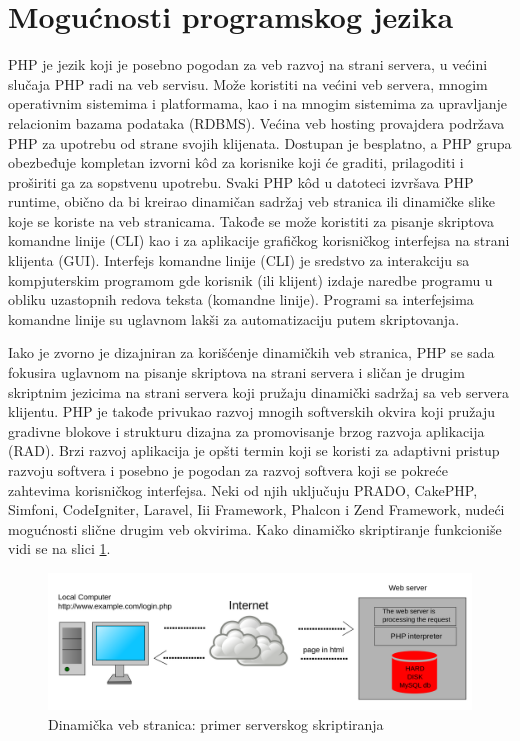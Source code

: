 \documentclass[a4paper]{article}
\begin{document}
{\section{Mogućnosti programskog jezika}
PHP je jezik koji je posebno pogodan za veb razvoj na strani servera, u većini slučaja PHP radi na veb servisu. Može koristiti na većini veb servera, mnogim operativnim sistemima i platformama, kao i na mnogim sistemima za upravljanje relacionim bazama podataka (RDBMS). Većina veb hosting provajdera podržava PHP za upotrebu od strane svojih klijenata. Dostupan je besplatno, a PHP grupa obezbeđuje kompletan izvorni k\^{o}d za korisnike koji će graditi, prilagoditi i proširiti ga za sopstvenu upotrebu. Svaki PHP k\^{o}d u datoteci izvršava PHP runtime\cite{php}, obično da bi kreirao dinamičan sadržaj veb stranica ili dinamičke slike koje se koriste na veb stranicama. Takođe se može koristiti za pisanje skriptova komandne linije (CLI) kao i za aplikacije grafičkog korisničkog interfejsa na strani klijenta (GUI). Interfejs komandne linije (CLI) je sredstvo za interakciju sa kompjuterskim programom gde korisnik (ili klijent) izdaje naredbe programu u obliku uzastopnih redova teksta (komandne linije). Programi sa interfejsima komandne linije su uglavnom lakši za automatizaciju putem skriptovanja. 

Iako je zvorno je dizajniran za korišćenje dinamičkih veb stranica, PHP se sada fokusira uglavnom na pisanje skriptova na strani servera i sličan je drugim skriptnim jezicima na strani servera koji pružaju dinamički sadržaj sa veb servera klijentu. PHP je takođe privukao razvoj mnogih softverskih okvira koji pružaju gradivne blokove i strukturu dizajna za promovisanje brzog razvoja aplikacija (RAD). Brzi razvoj aplikacija je opšti termin koji se koristi za adaptivni pristup razvoju softvera i posebno je pogodan za razvoj softvera koji se pokreće zahtevima korisničkog interfejsa. Neki od njih uključuju PRADO, CakePHP, Simfoni, CodeIgniter, Laravel, Iii Framework, Phalcon i Zend Framework, nudeći mogućnosti slične drugim veb okvirima\cite{PHPtheGoodParts}. Kako dinamičko skriptiranje funkcioniše vidi se na slici \ref{fig:server}.


\begin{figure}[h!]
\begin{center}
\includegraphics[scale=0.15]{primer_serverskog_skriptiranja.png}
\end{center}
\caption{Dinamička veb stranica: primer serverskog skriptiranja}
\label{fig:server}
\end{figure}

}
\end{document}

